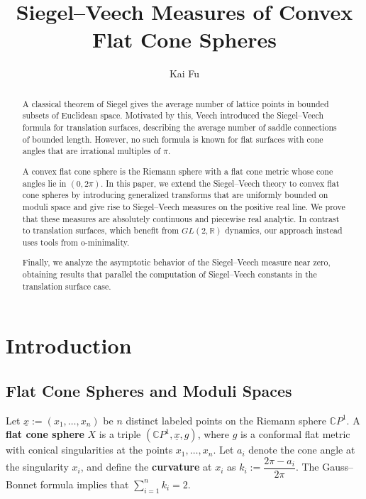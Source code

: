 \documentclass{compositio}
\title{Siegel--Veech Measures of Convex Flat Cone Spheres}
\author{Kai Fu}
\numberwithin{equation}{section}
\numberwithin{figure}{section}
\theoremstyle{definition}
\theoremstyle{plain}
\begin{document}
\begin{abstract}
A classical theorem of Siegel gives the average number of lattice points in bounded subsets of Euclidean space. Motivated by this, Veech introduced the Siegel--Veech formula for translation surfaces, describing the average number of saddle connections of bounded length. However, no such formula is known for flat surfaces with cone angles that are irrational multiples of $\pi$.

A convex flat cone sphere is the Riemann sphere with a flat cone metric whose cone angles lie in $(0,2\pi)$. In this paper, we extend the Siegel--Veech theory to convex flat cone spheres by introducing generalized transforms that are uniformly bounded on moduli space and give rise to Siegel--Veech measures on the positive real line. We prove that these measures are absolutely continuous and piecewise real analytic. In contrast to translation surfaces, which benefit from $GL(2,\mathbb{R})$ dynamics, our approach instead uses tools from o-minimality.

Finally, we analyze the asymptotic behavior of the Siegel--Veech measure near zero, obtaining results that parallel the computation of Siegel--Veech constants in the translation surface case.
\end{abstract}

\maketitle

\setcounter{tocdepth}{1}
\tableofcontents

\section{Introduction}\label{bigsec:intro}

\subsection{Flat Cone Spheres and Moduli Spaces}\label{sec:introflatspheresandmodulispace}
Let $\underline{x} := (x_1, \ldots, x_n)$ be $n$ distinct labeled points on the Riemann sphere $\mathbb{C}P^1$. A \textbf{flat cone sphere} $X$ is a triple $(\mathbb{C}P^1, \underline{x}, g)$, where $g$ is a conformal flat metric with conical singularities at the points $x_1, \ldots, x_n$. Let $a_i$ denote the cone angle at the singularity $x_i$, and define the \textbf{curvature} at $x_i$ as $k_i := \dfrac{2\pi - a_i}{2\pi}$. The Gauss--Bonnet formula implies that $\sum_{i=1}^n k_i = 2$. 
\end{document}
